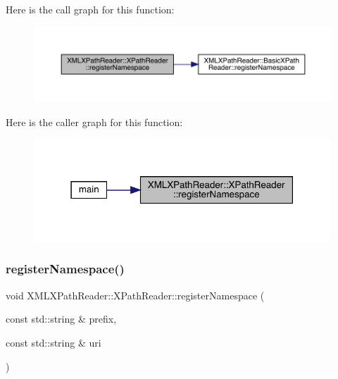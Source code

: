 Here is the call graph for this function\+:
\nopagebreak
\begin{figure}[H]
\begin{center}
\leavevmode
\includegraphics[width=350pt]{d3/d5a/classXMLXPathReader_1_1XPathReader_a4df21ae718977be11eb5669002522ebb_cgraph}
\end{center}
\end{figure}
Here is the caller graph for this function\+:
\nopagebreak
\begin{figure}[H]
\begin{center}
\leavevmode
\includegraphics[width=316pt]{d3/d5a/classXMLXPathReader_1_1XPathReader_a4df21ae718977be11eb5669002522ebb_icgraph}
\end{center}
\end{figure}
\mbox{\label{classXMLXPathReader_1_1XPathReader_a4df21ae718977be11eb5669002522ebb}} 
\subsubsection{\texorpdfstring{registerNamespace()}{registerNamespace()}\hspace{0.1cm}{\footnotesize\ttfamily [3/3]}}
{\footnotesize\ttfamily void X\+M\+L\+X\+Path\+Reader\+::\+X\+Path\+Reader\+::register\+Namespace (\begin{DoxyParamCaption}\item[{const std\+::string \&}]{prefix,  }\item[{const std\+::string \&}]{uri }\end{DoxyParamCaption})\hspace{0.3cm}{\ttfamily [inline]}}

